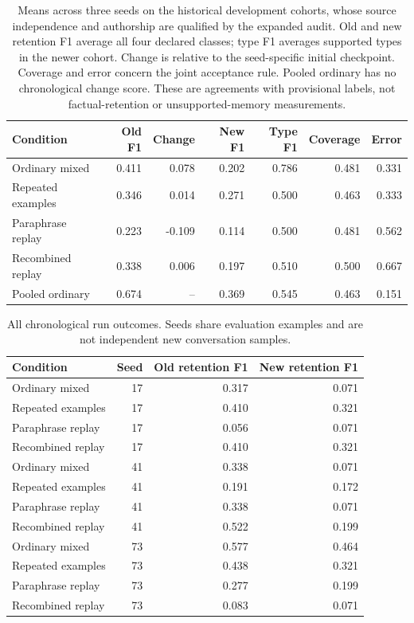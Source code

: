 \begin{table}[htbp]
\centering\small
\begin{tabularx}{\linewidth}{@{}Yrrrrrr@{}}
\toprule
Condition & Old F1 & Change & New F1 & Type F1 & Coverage & Error\\
\midrule
Ordinary mixed & 0.411 & 0.078 & 0.202 & 0.786 & 0.481 & 0.331\\
Repeated examples & 0.346 & 0.014 & 0.271 & 0.500 & 0.463 & 0.333\\
Paraphrase replay & 0.223 & -0.109 & 0.114 & 0.500 & 0.481 & 0.562\\
Recombined replay & 0.338 & 0.006 & 0.197 & 0.510 & 0.500 & 0.667\\
Pooled ordinary & 0.674 & -- & 0.369 & 0.545 & 0.463 & 0.151\\
\bottomrule
\end{tabularx}
\caption{Means across three seeds on the historical development cohorts, whose source independence and authorship are qualified by the expanded audit. Old and new retention F1 average all four declared classes; type F1 averages supported types in the newer cohort. Change is relative to the seed-specific initial checkpoint. Coverage and error concern the joint acceptance rule. Pooled ordinary has no chronological change score. These are agreements with provisional labels, not factual-retention or unsupported-memory measurements.}
\label{tab:replay-comparison}
\end{table}

\begin{table}[htbp]
\centering\small
\begin{tabular}{lrrr}
\toprule
Condition & Seed & Old retention F1 & New retention F1\\
\midrule
Ordinary mixed & 17 & 0.317 & 0.071\\
Repeated examples & 17 & 0.410 & 0.321\\
Paraphrase replay & 17 & 0.056 & 0.071\\
Recombined replay & 17 & 0.410 & 0.321\\
Ordinary mixed & 41 & 0.338 & 0.071\\
Repeated examples & 41 & 0.191 & 0.172\\
Paraphrase replay & 41 & 0.338 & 0.071\\
Recombined replay & 41 & 0.522 & 0.199\\
Ordinary mixed & 73 & 0.577 & 0.464\\
Repeated examples & 73 & 0.438 & 0.321\\
Paraphrase replay & 73 & 0.277 & 0.199\\
Recombined replay & 73 & 0.083 & 0.071\\
\bottomrule
\end{tabular}
\caption{All chronological run outcomes. Seeds share evaluation examples and are not independent new conversation samples.}
\end{table}

